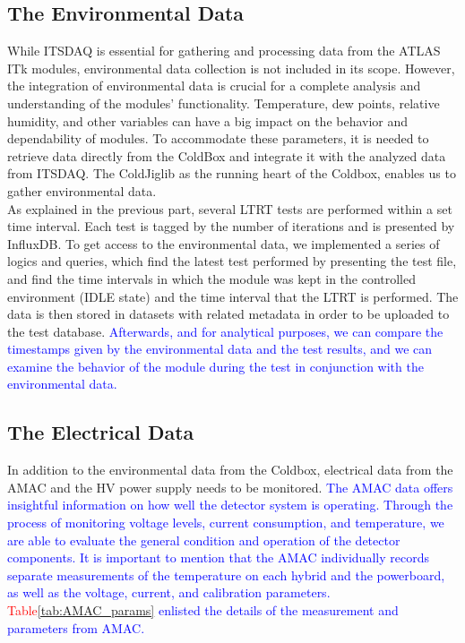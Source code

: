 \subsection{The Environmental Data}
While ITSDAQ is essential for gathering and processing data from the ATLAS ITk modules, environmental data collection is not included in its scope. However, the integration of environmental data is crucial for a complete analysis and understanding of the modules' functionality. Temperature, dew points, relative humidity, and other variables can have a big impact on the behavior and dependability of modules. To accommodate these parameters, it is needed to retrieve data directly from the ColdBox and integrate it with the analyzed data from ITSDAQ. The ColdJiglib as the running heart of the Coldbox, enables us to gather environmental data. \\

As explained in the previous part, several LTRT tests are performed within a set time interval. Each test is tagged by the number of iterations and is presented by InfluxDB. To get access to the environmental data, we implemented a series of logics and queries, which find the latest test performed by presenting the test file, and find the time intervals in which the module was kept in the controlled environment (IDLE state) and the time interval that the LTRT is performed. The data is then stored in datasets with related metadata in order to be uploaded to the test database. \textcolor{blue}{ Afterwards, and for analytical purposes, we can compare the timestamps given by the environmental data and the test results, and we can examine the behavior of the module during the test in conjunction with the environmental data.}


\subsection{The Electrical Data}
In addition to the environmental data from the Coldbox, electrical data from the AMAC and the HV power supply needs to be monitored.\textcolor{blue}{ The AMAC data offers insightful information on how well the detector system is operating. Through the process of monitoring voltage levels, current consumption, and temperature, we are able to evaluate the general condition and operation of the detector components. It is important to mention that the AMAC individually records separate measurements of the temperature on each hybrid and the powerboard, as well as the voltage, current, and calibration parameters. \textcolor{red}{Table\ref{tab:AMAC_params}} enlisted the details of the measurement and parameters from AMAC.} 


